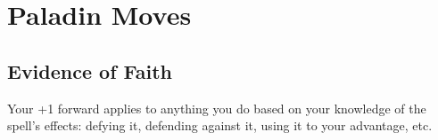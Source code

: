 \chapter{Paladin Moves}
   
 
\section{Evidence of Faith}    
 

Your +1 forward applies to anything you do based on your knowledge of the spell's effects: defying it, defending against it, using it to your advantage, etc.

 
